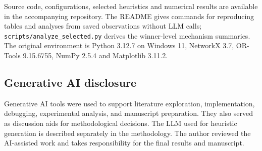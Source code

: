 Source code, configurations, selected heuristics and numerical results
are available in the accompanying repository. The README gives commands
for reproducing tables and analyses from saved observations without LLM
calls; \nolinkurl{scripts/analyze_selected.py} derives the winner-level
mechanism summaries. The original environment is Python 3.12.7 on
Windows 11, NetworkX 3.7, OR-Tools 9.15.6755, NumPy 2.5.4 and Matplotlib
3.11.2.

\subsection*{Generative AI disclosure}
Generative AI tools were used to support literature exploration, implementation, debugging, experimental analysis, and manuscript preparation. They also served as discussion aids for methodological decisions. The LLM used for heuristic generation is described separately in the methodology. The author reviewed the AI-assisted work and takes responsibility for the final results and manuscript.
